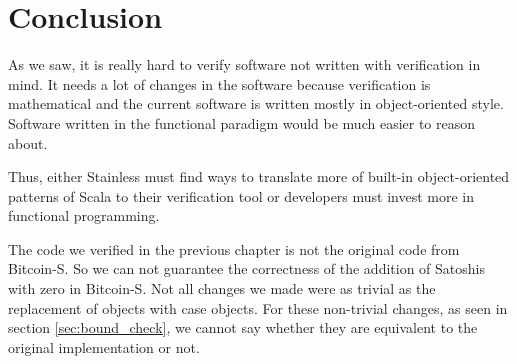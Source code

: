 \chapter{Conclusion}
\label{chap:conclusion}

As we saw, it is really hard to verify software not written with verification in mind.
It needs a lot of changes in the software because verification is mathematical and the current software is written mostly in object-oriented style.
Software written in the functional paradigm would be much easier to reason about.

Thus, either Stainless must find ways to translate more of built-in object-oriented patterns of Scala to their verification tool or developers must invest more in functional programming.

The code we verified in the previous chapter is not the original code from Bitcoin-S.
So we can not guarantee the correctness of the addition of Satoshis with zero in Bitcoin-S.
Not all changes we made were as trivial as the replacement of objects with case objects.
For these non-trivial changes, as seen in section \ref{sec:bound_check}, we cannot say whether they are equivalent to the original implementation or not.
